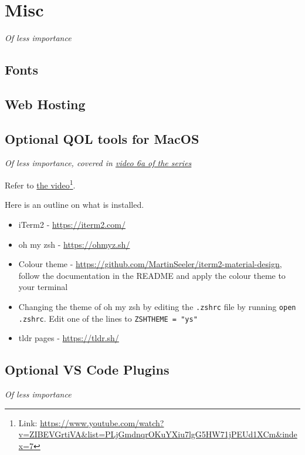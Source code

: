\chapter{Misc}
\label{sec:misc}

\textit{Of less importance}
\vspace{6mm}

\section{Fonts}

\section{Web Hosting}

\section{Optional QOL tools for MacOS}
\label{sec:iterm}
\textit{Of less importance, covered in \href{https://www.youtube.com/watch?v=ZIBEVGrtiVA&list=PLjGmdnqrOKuYXiu7lgG5HW71jPEUd1XCm&index=7}{video 6a of the series}}
\vspace{6mm}

Refer to \href{https://www.youtube.com/watch?v=ZIBEVGrtiVA&list=PLjGmdnqrOKuYXiu7lgG5HW71jPEUd1XCm&index=7}{the video}\footnote{Link: \url{https://www.youtube.com/watch?v=ZIBEVGrtiVA&list=PLjGmdnqrOKuYXiu7lgG5HW71jPEUd1XCm&index=7}}.

Here is an outline on what is installed.
\begin{itemize}
    \item iTerm2 - \url{https://iterm2.com/}
    \item oh my zsh - \url{https://ohmyz.sh/}
    \item Colour theme - \url{https://github.com/MartinSeeler/iterm2-material-design}, follow the documentation in the README and apply the colour theme to your terminal
    \item Changing the theme of oh my zsh by editing the \texttt{.zshrc} file by running \texttt{open .zshrc}. Edit one of the lines to \texttt{ZSH\textunderscore THEME = "ys"} 
    \item tldr pages - \url{https://tldr.sh/}

\end{itemize}

\section{Optional VS Code Plugins}
\textit{Of less importance}
\vspace{6mm}

